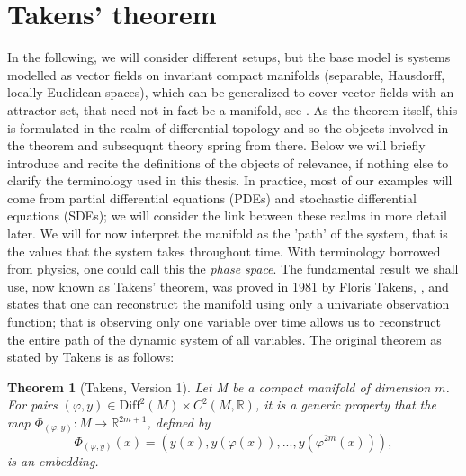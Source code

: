 \documentclass[11pt, a4paper]{memoir}
\theoremstyle{plain}
\newtheorem{thm}{Theorem}
\theoremstyle{definition}
\begin{document}
\section{Takens' theorem}
In the following, we will consider different setups, but the base model is systems modelled as vector fields on invariant compact manifolds (separable, Hausdorff, locally Euclidean spaces), which can be generalized to cover vector fields with an attractor set, that need not in fact be a manifold, see \cite{Sauer1991}. As the theorem itself, this is formulated in the realm of differential topology and so the objects involved in the theorem and subsequqnt theory spring from there. Below we will briefly introduce and recite the definitions of the objects of relevance, if nothing else to clarify the terminology used in this thesis. In practice, most of our examples will come from partial differential equations (PDEs) and stochastic differential equations (SDEs); we will consider the link between these realms in more detail later. We will for now interpret the manifold as the 'path' of the system, that is the values that the system takes throughout time. With terminology borrowed from physics, one could call this the \textit{phase space}. The fundamental result we shall use, now known as Takens' theorem, was proved in 1981 by Floris Takens, \cite{Takens}, and states that one can reconstruct the manifold using only a univariate observation function; that is observing only one variable over time allows us to reconstruct the entire path of the dynamic system of all variables. The original theorem as stated by Takens is as follows:
\begin{thm}[Takens, Version 1]
Let M be a compact manifold of dimension $m$. For pairs $(\varphi,y)\in \text{Diff}^2(M)\times C^2(M,\mathbb{R})$, it is a generic property that the map $\Phi_{(\varphi,y)}:M\to \mathbb{R}^{2m+1}$, defined by
$$\Phi_{(\varphi,y)}(x)=(y(x),y(\varphi(x)),...,y(\varphi^{2m}(x))),$$
is an embedding. \cite{Takens}
\end{thm}
\end{document}
